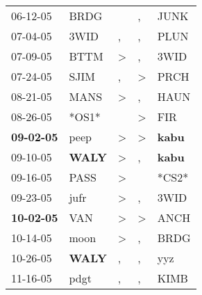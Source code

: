 \begin{supertabular}{p{0.07\textwidth}p{0.06\textwidth}p{0.02\textwidth}p{0.02\textwidth}p{0.06\textwidth}}
          06-12-05\textsuperscript{} &           BRDG\textsuperscript{} &                  &                , &           JUNK\textsuperscript{} \\
          07-04-05\textsuperscript{} &           3WID\textsuperscript{} &                , &                , &           PLUN\textsuperscript{} \\
          07-09-05\textsuperscript{} &           BTTM\textsuperscript{} &     \textgreater &                , &           3WID\textsuperscript{} \\
          07-24-05\textsuperscript{} &           SJIM\textsuperscript{} &                , &     \textgreater &           PRCH\textsuperscript{} \\
          08-21-05\textsuperscript{} &           MANS\textsuperscript{} &     \textgreater &                , &           HAUN\textsuperscript{} \\
          08-26-05\textsuperscript{} &                            *OS1* &                  &     \textgreater &            FIR\textsuperscript{} \\
 \textbf{09-02-05\textsuperscript{}} &           peep\textsuperscript{} &     \textgreater &     \textgreater &  \textbf{kabu\textsuperscript{}} \\
          09-10-05\textsuperscript{} &  \textbf{WALY\textsuperscript{}} &     \textgreater &                , &  \textbf{kabu\textsuperscript{}} \\
          09-16-05\textsuperscript{} &           PASS\textsuperscript{} &     \textgreater &                  &                            *CS2* \\
          09-23-05\textsuperscript{} &           jufr\textsuperscript{} &     \textgreater &                , &           3WID\textsuperscript{} \\
 \textbf{10-02-05\textsuperscript{}} &            VAN\textsuperscript{} &     \textgreater &     \textgreater &           ANCH\textsuperscript{} \\
          10-14-05\textsuperscript{} &           moon\textsuperscript{} &     \textgreater &                , &           BRDG\textsuperscript{} \\
          10-26-05\textsuperscript{} &  \textbf{WALY\textsuperscript{}} &                , &                , &            yyz\textsuperscript{} \\
          11-16-05\textsuperscript{} &           pdgt\textsuperscript{} &                , &                , &           KIMB\textsuperscript{} \\

\end{supertabular}
